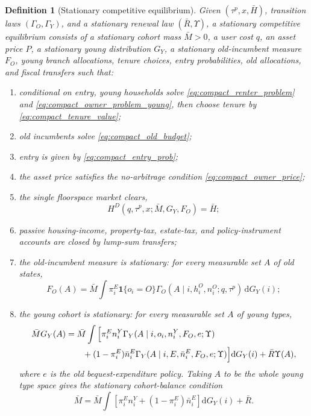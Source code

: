 \documentclass[11pt]{article}
\newtheorem{definition}{Definition}
\newcommand{\dd}{\mathrm d}
\newcommand{\1}{\mathbf 1}
\begin{document}
\begin{definition}[Stationary competitive equilibrium]
Given $(\tau^p,x,\bar H)$, transition laws $(\Gamma_O,\Gamma_Y)$, and a stationary renewal law $(\bar R,\Upsilon)$, a stationary competitive equilibrium consists of a stationary cohort mass $\bar M>0$, a user cost $q$, an asset price $P$, a stationary young distribution $G_Y$, a stationary old-incumbent measure $F_O$, young branch allocations, tenure choices, entry probabilities, old allocations, and fiscal transfers such that:
\begin{enumerate}
\item conditional on entry, young households solve \eqref{eq:compact_renter_problem} and \eqref{eq:compact_owner_problem_young}, then choose tenure by \eqref{eq:compact_tenure_value};
\item old incumbents solve \eqref{eq:compact_old_budget};
\item entry is given by \eqref{eq:compact_entry_prob};
\item the asset price satisfies the no-arbitrage condition \eqref{eq:compact_owner_price};
\item the single floorspace market clears,
\begin{equation}
H^{D}(q,\tau^p,x;\bar M,G_Y,F_O)=\bar H;
\label{eq:compact_floorspace_clearing}
\end{equation}
\item passive housing-income, property-tax, estate-tax, and policy-instrument accounts are closed by lump-sum transfers;
\item the old-incumbent measure is stationary: for every measurable set $A$ of old states,
\begin{equation}
F_O(A)
=
\bar M\int
\pi_i^E\1\{o_i=O\}
\Gamma_O(A\mid i,h_i^O,n_i^O;q,\tau^p)\,
\dd G_Y(i);
\label{eq:compact_old_stationarity}
\end{equation}
\item the young cohort is stationary: for every measurable set $A$ of young types,
\begin{align}
\bar M G_Y(A)
&=
\bar M\int
\Big[
\pi_i^E n_i^{Y}
\Gamma_Y(A\mid i,o_i,n_i^{Y},F_O,e;\Upsilon)
\notag\\
&\qquad
+(1-\pi_i^E)\bar n_i^E
\Gamma_Y(A\mid i,E,\bar n_i^E,F_O,e;\Upsilon)
\Big]\dd G_Y(i)
+
\bar R\Upsilon(A),
\label{eq:compact_young_stationarity}
\end{align}
where $e$ is the old bequest-expenditure policy. Taking $A$ to be the whole young type space gives the stationary cohort-balance condition
\begin{equation}
\bar M
=
\bar M\int
\left[
\pi_i^E n_i^{Y}+(1-\pi_i^E)\bar n_i^E
\right]\dd G_Y(i)
+
\bar R.
\label{eq:compact_cohort_stationarity}
\end{equation}
\end{enumerate}
\end{definition}
\end{document}
